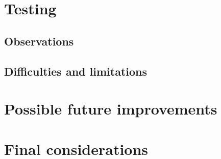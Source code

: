\documentclass{article}
\begin{document}
\begin{minipage}[t]{0.5\textwidth}
\end{minipage}


\newpage
\section{Testing}
\subsection{Observations}
\subsection{Difficulties and limitations}

\newpage
\section{Possible future improvements}

\newpage
\section{Final considerations}
\end{document}
